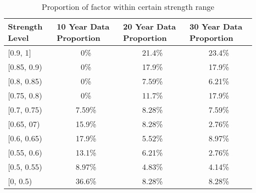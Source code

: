 \begin{table}[hbt!]
	\centering
	\caption{ Proportion of factor within certain strength range }\label{table:proportion}
	\begin{tabular}{lccc}
		\hline
		\hline
		Strength Level & \multicolumn{1}{l}{10 Year Data Proportion} & \multicolumn{1}{l}{20 Year Data Proportion} & \multicolumn{1}{l}{30 Year Data Proportion} \\ \hline
		{[}0.9, 1{]}   & 0\%                                         & 21.4\%                                      & 23.4\%                                         \\
		{[}0.85, 0.9)  & 0\%                                         & 17.9\%                                      & 17.9\%                                      \\
		{[}0.8, 0.85)  & 0\%                                         & 7.59\%                                      & 6.21\%                                      \\
		{[}0.75, 0.8)  & 0\%                                         & 11.7\%                                      & 17.9\%                                      \\
		{[}0.7, 0.75)  & 7.59\%                                      & 8.28\%                                      & 7.59\%                                      \\
		{[}0.65, 07)   & 15.9\%                                      & 8.28\%                                      & 2.76\%                                      \\
		{[}0.6, 0.65)  & 17.9\%                                      & 5.52\%                                      & 8.97\%                                      \\
		{[}0.55, 0.6)  & 13.1\%                                      & 6.21\%                                      & 2.76\%                                      \\
		{[}0.5, 0.55)  & 8.97\%                                      & 4.83\%                                      & 4.14\%                                      \\
		{[}0, 0.5)     & 36.6\%                                      & 8.28\%                                      & 8.28\%                                      \\ \hline\hline
	\end{tabular}
\end{table}

